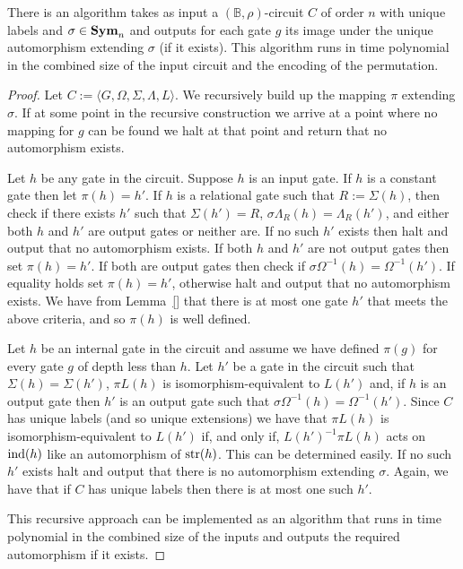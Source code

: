 \documentclass[../paper.tex]{subfiles}
\begin{document}
\begin{lem}
  There is an algorithm takes as input a $(\mathbb{B}, \rho)$-circuit $C$ of
  order $n$ with unique labels and $\sigma \in \text{\textbf{Sym}}_n$ and outputs for each gate
  $g$ its image under the unique automorphism extending $\sigma$ (if it exists).
  This algorithm runs in time polynomial in the combined size of the input
  circuit and the encoding of the permutation.
  \label{lem:compute-automorphisms}
\end{lem}
\begin{proof}
  Let $C := \langle G, \Omega, \Sigma, \Lambda, L \rangle$. We recursively build
  up the mapping $\pi$ extending $\sigma$. If at some point in the recursive
  construction we arrive at a point where no mapping for $g$ can be found we
  halt at that point and return that no automorphism exists.

  Let $h$ be any gate in the circuit. Suppose $h$ is an input gate. If $h$ is a
  constant gate then let $\pi (h) = h'$. If $h$ is a relational gate such that
  $R := \Sigma(h)$, then check if there exists $h'$ such that $\Sigma (h') = R$,
  $\sigma \Lambda_R(h) = \Lambda_R(h')$, and either both $h$ and $h'$ are output
  gates or neither are. If no such $h'$ exists then halt and output that no
  automorphism exists. If both $h$ and $h'$ are not output gates then set $\pi
  (h) = h'$. If both are output gates then check if $\sigma \Omega^{-1}(h) =
  \Omega^{-1}(h')$. If equality holds set $\pi(h) = h'$, otherwise halt and
  output that no automorphism exists. We have from Lemma~\ref{} that there is at
  most one gate $h'$ that meets the above criteria, and so $\pi(h)$ is well
  defined.

  Let $h$ be an internal gate in the circuit and assume we have defined $\pi
  (g)$ for every gate $g$ of depth less than $h$. Let $h'$ be a gate in the
  circuit such that $\Sigma(h) = \Sigma (h')$, $\pi L(h)$ is
  isomorphism-equivalent to $L(h')$ and, if $h$ is an output gate then $h'$ is
  an output gate such that $\sigma \Omega^{-1}(h) = \Omega^{-1}(h')$. Since $C$
  has unique labels (and so unique extensions) we have that $\pi L(h)$ is
  isomorphism-equivalent to $L(h')$ if, and only if, $L(h')^{-1}\pi L(h)$ acts
  on $\text{\upshape ind}(h)$ like an automorphism of $\text{str}(h)$. This can be determined easily.
  If no such $h'$ exists halt and output that there is no automorphism extending
  $\sigma$. Again, we have that if $C$ has unique labels then there is at most
  one such $h'$.

  This recursive approach can be implemented as an algorithm that runs in time
  polynomial in the combined size of the inputs and outputs the required
  automorphism if it exists.
\end{proof}
\end{document}
